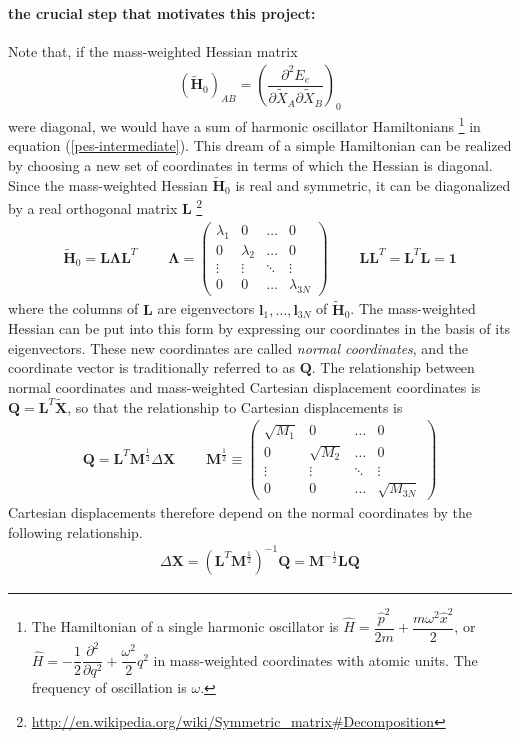 \documentclass[11pt]{article}
\newcommand{\bo}[1]{\ensuremath{\mathbf{#1}}}
\renewcommand{\sp}{\ \ \ \ \ \ \ \ \ \ }
\newcommand{\pt}{\partial}
\newcommand{\fr}[2]{\dfrac{#1}{#2}}
\newcommand{\pr}[1]{\left(#1\right)}
\newcommand{\ma}[1]{\left(\begin{matrix}#1\end{matrix}\right)}
\newcommand{\pd}[3]{\ensuremath{ \dfrac{ \partial^{#1} #2 }{\partial #3 ^{#1}}}}
\newcommand{\ld}{\ensuremath{\ldots}}
\newcommand{\vd}{\ensuremath{\vdots}}
\newcommand{\dd}{\ensuremath{\ddots}}
\newcommand{\op}[1]{\ensuremath{\hat{#1}}}
\newcommand{\w}{\ensuremath{\omega}}
\newcommand{\D}{\ensuremath{\Delta}}
\newcommand{\la}{\ensuremath{\lambda}}
\newcommand{\La}{\ensuremath{\Lambda}}
\newcommand{\tl}[1]{\ensuremath{\tilde{#1}}}
\begin{document}
\paragraph{the crucial step that motivates this project:}
Note that, if the mass-weighted Hessian matrix
\begin{align}
	(\tl{\bo{H}}_0)_{AB}
=
	\pr{\fr{\pt^2 E_e}{\pt\tl{X}_A\pt\tl{X}_B}}_0
\end{align}
 were diagonal, we would have a sum of harmonic oscillator Hamiltonians \footnote{The Hamiltonian of a single harmonic oscillator is $\op{H}=\fr{\op{p}^2}{2m}+\fr{m\w^2\op{x}^2}{2}$, or $\op{H}=-\fr{1}{2}\pd{2}{}{q}+\fr{\w^2}{2}q^2$ in mass-weighted coordinates with atomic units.  The frequency of oscillation is $\w$.} in equation (\ref{pes-intermediate}).
This dream of a simple Hamiltonian can be realized by choosing a new set of coordinates in terms of which the Hessian is diagonal.
Since the mass-weighted Hessian $\tl{\bo{H}}_0$ is real and symmetric, it can be diagonalized by a real orthogonal matrix $\bo{L}$ \footnote{\url{http://en.wikipedia.org/wiki/Symmetric_matrix\#Decomposition}}
\begin{align}
	\tl{\bo{H}}_0
=
	\bo{L}\bm{\La}\bo{L}^T
\sp
%
	\bm{\La}
=
	\ma{\la_1&0&\ld&0\\
		0&\la_2&\ld&0\\
		\vd&\vd&\dd&\vd\\
		0&0&\ld&\la_{3N}}
\sp
%
	\bo{L}\bo{L}^T=\bo{L}^T\bo{L}=\bo{1}
\end{align}
where the columns of $\bo{L}$ are eigenvectors $\bm{l}_1,\ld,\bm{l}_{3N}$ of $\tl{\bo{H}}_0$.
The mass-weighted Hessian can be put into this form by expressing our coordinates in the basis of its eigenvectors.
These new coordinates are called {\it normal coordinates}, and the coordinate vector is traditionally referred to as $\bo{Q}$.
The relationship between normal coordinates and mass-weighted Cartesian displacement coordinates is $\bo{Q}=\bo{L}^T\tl{\bo{X}}$, so that the relationship to Cartesian displacements is
\begin{align}
\label{q-to-dx}
%
	\bo{Q}
=
	\bo{L}^T
	\bo{M}^{\frac{1}{2}}
	\D\bo{X}
\sp
%
	\bo{M}^{\frac{1}{2}}
\equiv
	\ma{\sqrt{M_1}&0&\ld&0\\
		0&\sqrt{M_2}&\ld&0\\
		\vd&\vd&\dd&\vd\\
		0&0&\ld&\sqrt{M_{3N}}}
\end{align}
Cartesian displacements therefore depend on the normal coordinates by the following relationship.
\begin{align*}
%
	\D\bo{X}
=
	(\bo{L}^T\bo{M}^{\frac{1}{2}})^{-1}\bo{Q}
=
	\bo{M}^{-\frac{1}{2}}\bo{L}\bo{Q}
\end{align*}
\end{document}
